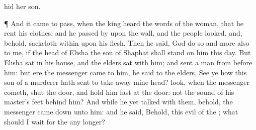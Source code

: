 {hid her
son.
\par }{\PP {}¶ And it came to pass, when the
king
heard the
words of the
woman, that he
rent his
clothes; and he passed
by upon the
wall, and the
people
looked, and, behold,
{}
sackcloth
within upon his
flesh.
Then he
said,
God
do so and
more also to me, if the
head of
Elisha the
son of
Shaphat shall
stand on him this
day.
But
Elisha
sat in his
house, and the
elders
sat with him; and
{}
sent a
man from
before him: but ere the
messenger
came to him, he
said to the
elders,
See ye how this
son of a
murderer hath
sent to take
away mine
head?
look, when the
messenger
cometh,
shut the
door, and hold him
fast at the
door:
{} not the
sound of his
master’s
feet
behind him?
And while he yet
talked with them, behold, the
messenger came
down unto him: and he
said, Behold, this
evil
{} of the
{}; what should I
wait for the
{} any longer?

}
